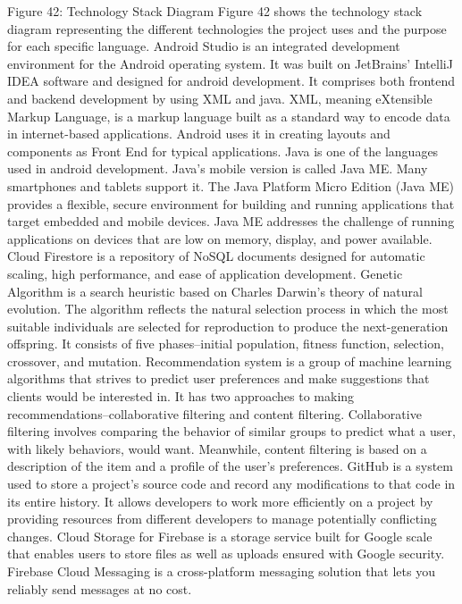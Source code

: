 Figure 42: Technology Stack Diagram
Figure 42 shows the technology stack diagram representing the different technologies the project uses and the purpose for each specific language. 
Android Studio is an integrated development environment for the Android operating system. It was built on JetBrains' IntelliJ IDEA software and designed for android development. It comprises both frontend and backend development by using XML and java.
XML, meaning eXtensible Markup Language, is a markup language built as a standard way to encode data in internet-based applications. Android uses it in creating layouts and components as Front End for typical applications.
Java is one of the languages used in android development. Java's mobile version is called Java ME. Many smartphones and tablets support it. The Java Platform Micro Edition (Java ME) provides a flexible, secure environment for building and running applications that target embedded and mobile devices. Java ME addresses the challenge of running applications on devices that are low on memory, display, and power available.
Cloud Firestore is a repository of NoSQL documents designed for automatic scaling, high performance, and ease of application development. 
Genetic Algorithm is a search heuristic based on Charles Darwin's theory of natural evolution. The algorithm reflects the natural selection process in which the most suitable individuals are selected for reproduction to produce the next-generation offspring. It consists of five phases–initial population, fitness function, selection, crossover, and mutation.
 Recommendation system is a group of machine learning algorithms that strives to predict user preferences and make suggestions that clients would be interested in. It has two approaches to making recommendations–collaborative filtering and content filtering. Collaborative filtering involves comparing the behavior of similar groups to predict what a user, with likely behaviors, would want. Meanwhile, content filtering is based on a description of the item and a profile of the user's preferences.
GitHub is a system used to store a project's source code and record any modifications to that code in its entire history. It allows developers to work more efficiently on a project by providing resources from different developers to manage potentially conflicting changes.
Cloud Storage for Firebase is a storage service built for Google scale that enables users to store files as well as uploads ensured with Google security. 
Firebase Cloud Messaging is a cross-platform messaging solution that lets you reliably send messages at no cost.
